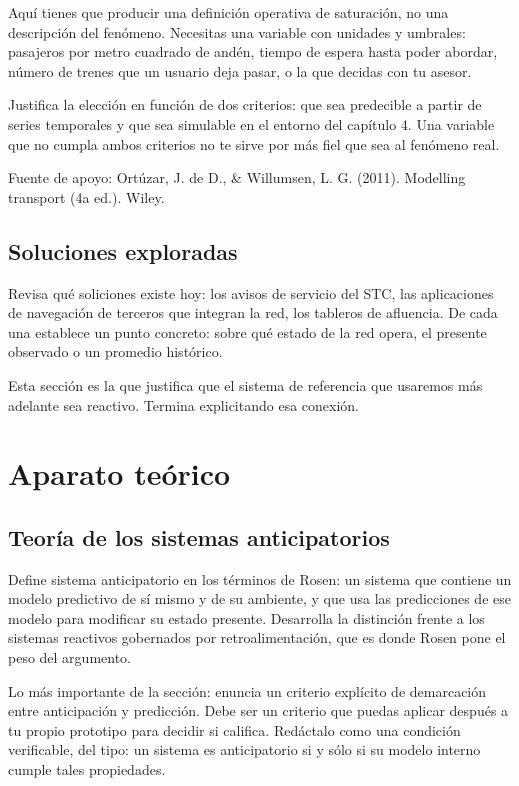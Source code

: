 \documentclass[letterpaper,12pt,oneside]{book}
\theoremstyle{definition}
\theoremstyle{plain}
\theoremstyle{remark}
\begin{document}
Aquí tienes que producir una definición operativa de saturación, no una descripción del fenómeno. Necesitas una variable con unidades y umbrales: pasajeros por metro cuadrado de andén, tiempo de espera hasta poder abordar, número de trenes que un usuario deja pasar, o la que decidas con tu asesor.

Justifica la elección en función de dos criterios: que sea predecible a partir de series temporales y que sea simulable en el entorno del capítulo 4. Una variable que no cumpla ambos criterios no te sirve por más fiel que sea al fenómeno real.

Fuente de apoyo: Ortúzar, J. de D., \& Willumsen, L. G. (2011). Modelling transport (4a ed.). Wiley. 

\section{Soluciones exploradas}
Revisa qué soliciones existe hoy: los avisos de servicio del STC, las aplicaciones de navegación de terceros que integran la red, los tableros de afluencia. De cada una establece un punto concreto: sobre qué estado de la red opera, el presente observado o un promedio histórico.

Esta sección es la que justifica que el sistema de referencia que usaremos más adelante sea reactivo. Termina explicitando esa conexión.

\chapter{Aparato teórico}
\section{Teoría de los sistemas anticipatorios}

Define sistema anticipatorio en los términos de Rosen: un sistema que contiene un modelo predictivo de sí mismo y de su ambiente, y que usa las predicciones de ese modelo para modificar su estado presente. Desarrolla la distinción frente a los sistemas reactivos gobernados por retroalimentación, que es donde Rosen pone el peso del argumento.

Lo más importante de la sección: enuncia un criterio explícito de demarcación entre anticipación y predicción. Debe ser un criterio que puedas aplicar después a tu propio prototipo para decidir si califica. Redáctalo como una condición verificable, del tipo: un sistema es anticipatorio si y sólo si su modelo interno cumple tales propiedades.
\end{document}
